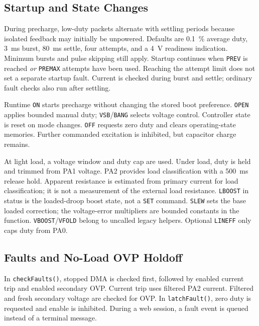 \subsection{Startup and State Changes}

During precharge, low-duty packets alternate with settling periods because isolated feedback may initially be unpowered. Defaults are \SI{0.1}{\percent} average duty, \SI{3}{\milli\second} burst, \SI{80}{\milli\second} settle, four attempts, and a \SI{4}{\volt} readiness indication. Minimum bursts and pulse skipping still apply. Startup continues when \texttt{PREV} is reached \emph{or} \texttt{PREMAX} attempts have been used. Reaching the attempt limit does not set a separate startup fault. Current is checked during burst and settle; ordinary fault checks also run after settling.

Runtime \texttt{ON} starts precharge without changing the stored boot preference. \texttt{OPEN} applies bounded manual duty; \texttt{VSB}/\texttt{BANG} selects voltage control. Controller state is reset on mode changes. \texttt{OFF} requests zero duty and clears operating-state memories. Further commanded excitation is inhibited, but capacitor charge remains.

At light load, a voltage window and duty cap are used. Under load, duty is held and trimmed from PA1 voltage. PA2 provides load classification with a \SI{500}{\milli\second} release hold. Apparent resistance is estimated from primary current for load classification; it is not a measurement of the external load resistance. \texttt{LBOOST} in status is the loaded-droop boost state, not a \texttt{SET} command. \texttt{SLEW} sets the base loaded correction; the voltage-error multipliers are bounded constants in the function. \texttt{VBOOST}/\texttt{VFOLD} belong to uncalled legacy helpers. Optional \texttt{LINEFF} only caps duty from PA0.

\subsection{Faults and No-Load OVP Holdoff}

In \texttt{checkFaults()}, stopped DMA is checked first, followed by enabled current trip and enabled secondary OVP. Current trip uses filtered PA2 current. Filtered and fresh secondary voltage are checked for OVP. In \texttt{latchFault()}, zero duty is requested and enable is inhibited. During a web session, a fault event is queued instead of a terminal message.

